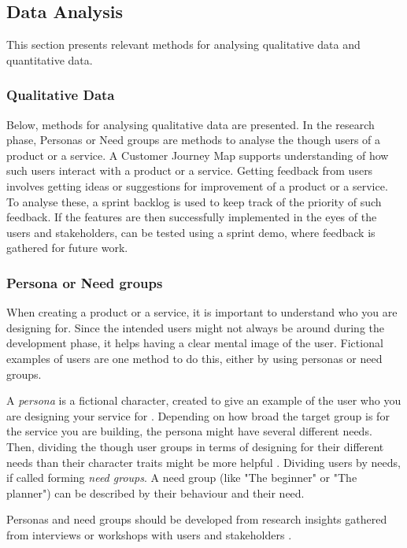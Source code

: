 \subsection{Data Analysis}\label{sec:data-analysis}

This section presents relevant methods for analysing qualitative data and quantitative data.

\subsubsection{Qualitative Data}

Below, methods for analysing qualitative data are presented. In the research phase, Personas or Need groups are methods to analyse the though users of a product or a service. A Customer Journey Map supports understanding of how such users interact with a product or a service. Getting feedback from users involves getting ideas or suggestions for improvement of a product or a service. To analyse these, a sprint backlog is used to keep track of the priority of such feedback. If the features are then successfully implemented in the eyes of the users and stakeholders, can be tested using a sprint demo, where feedback is gathered for future work.

\subsubsection{Persona or Need groups}
When creating a product or a service, it is important to understand who you are designing for. Since the intended users might not always be around during the development phase, it helps having a clear mental image of the user. Fictional examples of users are one method to do this, either by using personas or need groups.

A \textit{persona} is a fictional character, created to give an example of the user who you are designing your service for \citep{stickdorn}. Depending on how broad the target group is for the service you are building, the persona might have several different needs. Then, dividing the though user groups in terms of designing for their different needs than their character traits might be more helpful \citep{expedition-mondial}. Dividing users by needs, if called forming \textit{need groups}. A need group (like "The beginner" or "The planner") can be described by their behaviour and their need.

Personas and need groups should be developed from research insights gathered from interviews or workshops with users and stakeholders \citep{stickdorn}.


